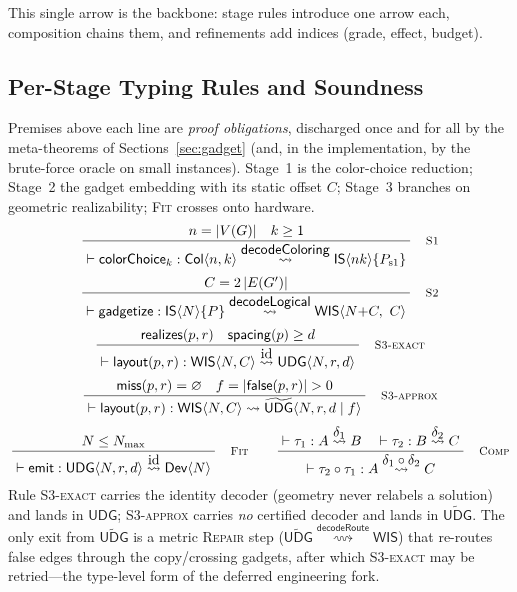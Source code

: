 \documentclass[11pt]{article}
\theoremstyle{definition}
\theoremstyle{remark}
\newcommand{\tCol}{\mathsf{Col}}
\newcommand{\tIS}{\mathsf{IS}}
\newcommand{\tWIS}{\mathsf{WIS}}
\newcommand{\tUDG}{\mathsf{UDG}}
\newcommand{\tUDGa}{\widetilde{\mathsf{UDG}}}
\newcommand{\tDev}{\mathsf{Dev}}
\newcommand{\Nmax}{N_{\max}}
\newcommand{\realizes}{\mathsf{realizes}}
\newcommand{\false}{\mathsf{false}}
\newcommand{\miss}{\mathsf{miss}}
\newcommand{\rn}[1]{\textsc{\footnotesize #1}}
\newcommand{\irule}[2]{\ensuremath{\dfrac{\;#1\;}{\;#2\;}}}
\newcommand{\redto}[1]{\mathrel{\overset{\textstyle #1}{\rightsquigarrow}}}
\begin{document}
This single arrow is the backbone: stage rules introduce one arrow each,
composition chains them, and refinements add indices (grade, effect, budget).

\subsection{Per-Stage Typing Rules and Soundness}
\label{sec:typing}

Premises above each line are \emph{proof obligations}, discharged once and for all
by the meta-theorems of Sections~\ref{sec:gadget} (and, in the implementation, by
the brute-force oracle on small instances). Stage~1 is the color-choice reduction;
Stage~2 the gadget embedding with its static offset $C$; Stage~3 branches on
geometric realizability; \rn{Fit} crosses onto hardware.
\[
  \irule{n=|V(G)| \quad k\ge 1}
        {\vdash \mathsf{colorChoice}_k : \tCol\langle n,k\rangle
          \redto{\mathsf{decodeColoring}} \tIS\langle nk\rangle\{P_{\mathrm{s1}}\}}
  \quad\rn{S1}
\]
\[
  \irule{C = 2\,|E(G')|}
        {\vdash \mathsf{gadgetize} : \tIS\langle N\rangle\{P\}
          \redto{\mathsf{decodeLogical}} \tWIS\langle N{+}C,\ C\rangle}
  \quad\rn{S2}
\]
\[
  \irule{\realizes(p,r) \quad \mathsf{spacing}(p)\ge d}
        {\vdash \mathsf{layout}(p,r): \tWIS\langle N,C\rangle
          \redto{\mathrm{id}} \tUDG\langle N,r,d\rangle}
  \quad\rn{S3-exact}
\]
\[
  \irule{\miss(p,r)=\varnothing \quad f=|\false(p,r)|>0}
        {\vdash \mathsf{layout}(p,r): \tWIS\langle N,C\rangle
          \rightsquigarrow \tUDGa\langle N,r,d \mid f\rangle}
  \quad\rn{S3-approx}
\]
\[
  \irule{N\le \Nmax}
        {\vdash \mathsf{emit} : \tUDG\langle N,r,d\rangle \redto{\mathrm{id}} \tDev\langle N\rangle}
  \quad\rn{Fit}
\qquad
  \irule{\vdash \tau_1 : A \redto{\delta_1} B \quad \vdash \tau_2 : B \redto{\delta_2} C}
        {\vdash \tau_2\circ\tau_1 : A \redto{\delta_1\circ\delta_2} C}
  \quad\rn{Comp}
\]
Rule \rn{S3-exact} carries the identity decoder (geometry never relabels a
solution) and lands in $\tUDG$; \rn{S3-approx} carries \emph{no} certified decoder
and lands in $\tUDGa$. The only exit from $\tUDGa$ is a metric \rn{Repair} step
($\tUDGa \redto{\mathsf{decodeRoute}} \tWIS$) that re-routes false edges through the
copy/crossing gadgets, after which \rn{S3-exact} may be retried---the type-level
form of the deferred engineering fork.
\end{document}
